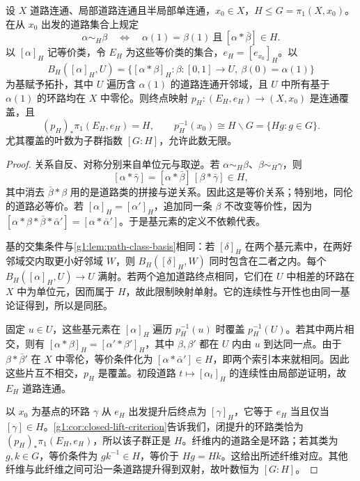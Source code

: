 \begin{theorem}\label{g1:thm:subgroup-covering}
	设 \(X\) 道路连通、局部道路连通且半局部单连通，\(x_0\in X\)，\(H\le G=\pi_1(X,x_0)\)。在从 \(x_0\) 出发的道路集合上规定
	\[
		\alpha\sim_H\beta\quad\Longleftrightarrow\quad
		\alpha(1)=\beta(1)\ \text{且}\ [\alpha*\bar\beta]\in H.
	\]
	以 \([\alpha]_H\) 记等价类，令 \(E_H\) 为这些等价类的集合，\(e_H=[e_{x_0}]_H\)。以
	\[
		B_H([\alpha]_H,U)=\{[\alpha*\beta]_H:\beta:[0,1]\to U,\ \beta(0)=\alpha(1)\}
	\]
	为基赋予拓扑，其中 \(U\) 遍历含 \(\alpha(1)\) 的道路连通开邻域，且 \(U\) 中所有基于 \(\alpha(1)\) 的环路均在 \(X\) 中零伦。则终点映射 \(p_H:(E_H,e_H)\to(X,x_0)\) 是连通覆盖，且
	\[
		(p_H)_*\pi_1(E_H,e_H)=H,\qquad p_H^{-1}(x_0)\cong H\backslash G=\{Hg:g\in G\}.
	\]
	尤其覆盖的叶数为子群指数 \([G:H]\)，允许此数无限。
\end{theorem}
\begin{proof}
	关系自反、对称分别来自单位元与取逆。若 \(\alpha\sim_H\beta\)、\(\beta\sim_H\gamma\)，则
	\[
		[\alpha*\bar\gamma]=[\alpha*\bar\beta]\,[\beta*\bar\gamma]\in H,
	\]
	其中消去 \(\bar\beta*\beta\) 用的是道路类的拼接与逆关系。因此这是等价关系；特别地，同伦的道路必等价。若 \([\alpha]_H=[\alpha']_H\)，追加同一条 \(\beta\) 不改变等价性，因为 \([\alpha*\beta*\bar\beta*\bar\alpha']=[\alpha*\bar\alpha']\)。于是基元素的定义不依赖代表。

	基的交集条件与\cref{g1:lem:path-class-basis}相同：若 \([\delta]_H\) 在两个基元素中，在两好邻域交内取更小好邻域 \(W\)，则 \(B_H([\delta]_H,W)\) 同时包含在二者之内。每个 \(B_H([\alpha]_H,U)\to U\) 满射。若两个追加道路终点相同，它们在 \(U\) 中相差的环路在 \(X\) 中为单位元，因而属于 \(H\)，故此限制映射单射。它的连续性与开性也由同一基论证得到，所以是同胚。

	固定 \(u\in U\)，这些基元素在 \([\alpha]_H\) 遍历 \(p_H^{-1}(u)\) 时覆盖 \(p_H^{-1}(U)\)。若其中两片相交，则有 \([\alpha*\beta]_H=[\alpha'*\beta']_H\)，其中 \(\beta,\beta'\) 都在 \(U\) 内由 \(u\) 到达同一点。由于 \(\beta*\bar\beta'\) 在 \(X\) 中零伦，等价条件化为 \([\alpha*\bar\alpha']\in H\)，即两个索引本来就相同。因此这些片互不相交，\(p_H\) 是覆盖。初段道路 \(t\mapsto[\alpha_t]_H\) 的连续性由局部逆证明，故 \(E_H\) 道路连通。

	以 \(x_0\) 为基点的环路 \(\gamma\) 从 \(e_H\) 出发提升后终点为 \([\gamma]_H\)，它等于 \(e_H\) 当且仅当 \([\gamma]\in H\)。\cref{g1:cor:closed-lift-criterion}告诉我们，闭提升的环路类恰为 \((p_H)_*\pi_1(E_H,e_H)\)，所以该子群正是 \(H\)。纤维内的道路全是环路；若其类为 \(g,k\in G\)，等价条件为 \(gk^{-1}\in H\)，等价于 \(Hg=Hk\)。这给出所述纤维对应。其他纤维与此纤维之间可沿一条道路提升得到双射，故叶数恒为 \([G:H]\)。
\end{proof}

